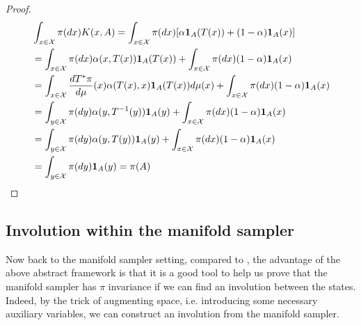 \documentclass{article}
\begin{document}
\begin{proof}
\begin{align*}
& \int_{x \in {\cal X}} \pi(dx) K(x, A) = \int_{x \in {\cal X}} \pi(dx) [\alpha{\mathbf 1}_A(T(x)) + (1-\alpha){\mathbf 1}_A(x)]\\
& = \int_{x \in {\cal X}} \pi(dx) \alpha(x, T(x)) {\mathbf 1}_A(T(x)) + \int_{x \in {\cal X}} \pi(dx) (1 - \alpha) {\mathbf 1}_A(x)\\
& = \int_{x \in {\cal X}} \frac{d T^*\pi}{d\mu}(x) \alpha(T(x), x){\mathbf 1}_A(T(x)) d\mu(x) + \int_{x \in {\cal X}} \pi(dx) (1 - \alpha) {\mathbf 1}_A(x)\\
& = \int_{y \in {\cal X}} \pi(dy) \alpha(y, T^{-1}(y)) {\mathbf 1}_A(y) + \int_{x \in {\cal X}} \pi(dx) (1 - \alpha) {\mathbf 1}_A(x)\\
& = \int_{y \in {\cal X}} \pi(dy) \alpha(y, T(y)) {\mathbf 1}_A(y) + \int_{x \in {\cal X}} \pi(dx) (1 - \alpha) {\mathbf 1}_A(x)\\
& = \int_{y \in {\cal X}} \pi(dy) {\mathbf 1}_A(y) = \pi(A)\\
\end{align*}

\end{proof}





\subsection{Involution within the manifold sampler}
Now back to the manifold sampler setting, compared to \cite{manifoldparent}, the advantage of the above abstract framework is that it is a good tool to help us prove that the manifold sampler has $\pi$ invariance if we can find an involution between the states. Indeed, by the trick of augmenting space, i.e. introducing some necessary auxiliary variables, we can construct an involution from the manifold sampler.
\end{document}
